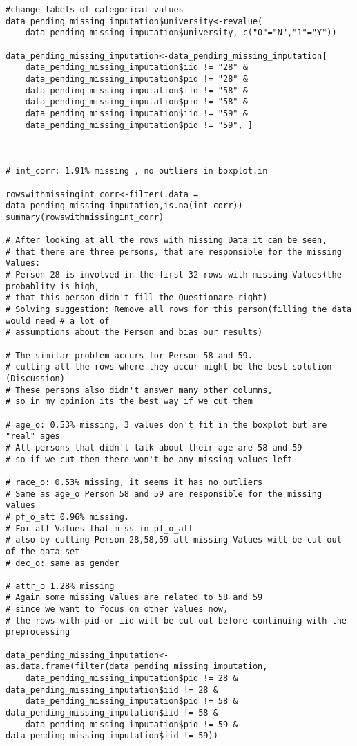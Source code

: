 \begin{verbatim}
#change labels of categorical values
data_pending_missing_imputation$university<-revalue(
    data_pending_missing_imputation$university, c("0"="N","1"="Y"))

data_pending_missing_imputation<-data_pending_missing_imputation[
    data_pending_missing_imputation$iid != "28" & 
    data_pending_missing_imputation$pid != "28" & 
    data_pending_missing_imputation$iid != "58" & 
    data_pending_missing_imputation$pid != "58" &
    data_pending_missing_imputation$iid != "59" &
    data_pending_missing_imputation$pid != "59", ]



# int_corr: 1.91% missing , no outliers in boxplot.in

rowswithmissingint_corr<-filter(.data = data_pending_missing_imputation,is.na(int_corr))
summary(rowswithmissingint_corr)

# After looking at all the rows with missing Data it can be seen, 
# that there are three persons, that are responsible for the missing Values:
# Person 28 is involved in the first 32 rows with missing Values(the probablity is high, 
# that this person didn't fill the Questionare right)
# Solving suggestion: Remove all rows for this person(filling the data would need # a lot of
# assumptions about the Person and bias our results)

# The similar problem accurs for Person 58 and 59.
# cutting all the rows where they accur might be the best solution (Discussion)
# These persons also didn't answer many other columns, 
# so in my opinion its the best way if we cut them

# age_o: 0.53% missing, 3 values don't fit in the boxplot but are "real" ages
# All persons that didn't talk about their age are 58 and 59 
# so if we cut them there won't be any missing values left

# race_o: 0.53% missing, it seems it has no outliers
# Same as age_o Person 58 and 59 are responsible for the missing values
# pf_o_att 0.96% missing.
# For all Values that miss in pf_o_att 
# also by cutting Person 28,58,59 all missing Values will be cut out of the data set
# dec_o: same as gender

# attr_o 1.28% missing
# Again some missing Values are related to 58 and 59 
# since we want to focus on other values now, 
# the rows with pid or iid will be cut out before continuing with the preprocessing

data_pending_missing_imputation<-as.data.frame(filter(data_pending_missing_imputation,
    data_pending_missing_imputation$pid != 28 & data_pending_missing_imputation$iid != 28 &
    data_pending_missing_imputation$pid != 58 & data_pending_missing_imputation$iid != 58 &
    data_pending_missing_imputation$pid != 59 & data_pending_missing_imputation$iid != 59))
    


\end{verbatim}
